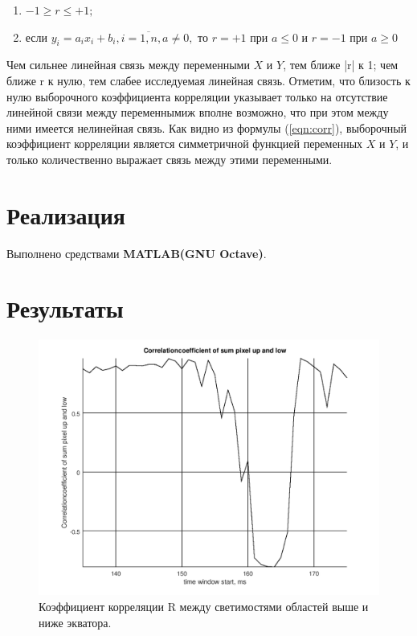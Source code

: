 \documentclass[12pt]{article}
\begin{document}
\begin{enumerate}
\item $-1 \geq r \leq +1;$
\item если $y_{i} = a_{i}x_{i} + b_{i}, i = \overline{1, n}, a \neq 0, $ то $r = + 1$ при $a\leq 0$ и $r = - 1$ при $a\geq 0$
\end{enumerate}

Чем сильнее линейная связь между переменными $X$ и $Y$, тем ближе |r| к 1; чем ближе r к нулю, тем слабее исследуемая линейная связь.
Отметим, что близость к нулю выборочного коэффициента корреляции указывает только на отсутствие линейной связи между переменнымиж вполне возможно, что при этом между ними имеется нелинейная связь.
Как видно из формулы (\ref{eqn:corr}), выборочный коэффициент корреляции является симметричной функцией переменных $X$ и $Y$, и только количественно выражает связь между этими переменными.\cite{max}
\section{Реализация}
Выполнено средствами \textbf{MATLAB(GNU Octave)}.

\section{Результаты}

\begin{figure}[H]
\caption{Коэффициент корреляции R между светимостями областей выше и ниже экватора.}
\begin{center}
\includegraphics[scale = 0.8]{plot3.png} 
\end{center}
\end{figure}
\end{document}
